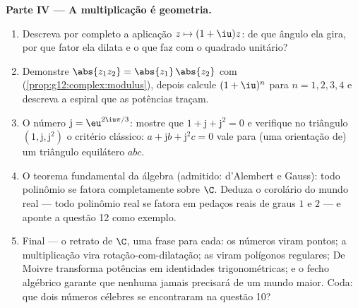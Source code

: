 \begin{problem}
\medskip
\noindent\textbf{Parte IV --- A multiplicação é geometria.}
\begin{enumerate}[resume]
  \item Descreva por completo a aplicação
        $z \mapsto (1 + \iu)z$: de que ângulo ela gira, por que
        fator ela dilata e o que faz com o quadrado unitário?
  \item Demonstre $\abs{z_1 z_2} = \abs{z_1}\,\abs{z_2}$ com
         (\cref{prop:g12:complex:modulus}), depois
        calcule $(1+\iu)^n$ para $n = 1, 2, 3, 4$ e descreva a
        espiral que as potências traçam.
  \item O número $\mathrm{j} = \eu^{2\iu\pi/3}$: mostre que
        $1 + \mathrm{j} + \mathrm{j}^2 = 0$ e verifique no
        triângulo $\left(1, \mathrm{j}, \mathrm{j}^2\right)$ o
        critério clássico: $a + \mathrm{j} b + \mathrm{j}^2 c = 0$
        vale para (uma orientação de) um triângulo equilátero
        $abc$.
  \item O teorema fundamental da álgebra (admitido:
        d'Alembert e Gauss): todo polinômio se fatora
        completamente sobre $\C$. Deduza o corolário do mundo
        real --- todo polinômio real se fatora em pedaços reais
        de graus $1$ e $2$ --- e aponte a questão 12 como
        exemplo.
  \item Final --- o retrato de $\C$, uma frase para cada: os
        números viram pontos; a multiplicação vira
        rotação-com-dilatação; as  viram
        polígonos regulares; De Moivre transforma potências em
        identidades trigonométricas; e o fecho algébrico garante
        que nenhuma  jamais precisará de um mundo maior.
        Coda: que dois números célebres se encontraram na
        questão 10?
\end{enumerate}
\end{problem}
